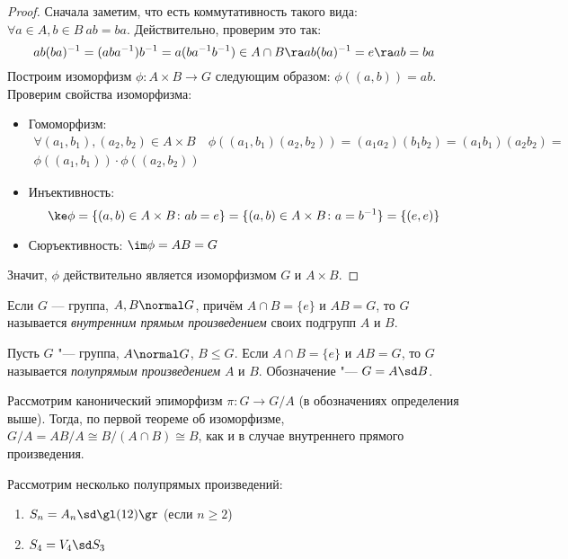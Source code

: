 \begin{proof}
	Сначала заметим, что есть коммутативность такого вида: $\forall a \in A, b \in B\ ab = ba$. Действительно, проверим это так:
	\[
		ab(ba)^{-1} = (aba^{-1})b^{-1} = a(ba^{-1}b^{-1}) \in A \cap B \ra ab(ba)^{-1} = e \ra ab = ba
	\]
	Построим изоморфизм $\phi \colon A \times B \to G$ следующим образом: $\phi((a, b)) = ab$. Проверим свойства изоморфизма:
	\begin{itemize}
		\item Гомоморфизм:
		\begin{multline*}
			\forall (a_1, b_1), (a_2, b_2) \in A \times B \quad \phi((a_1, b_1)(a_2, b_2)) = (a_1a_2)(b_1b_2) = (a_1b_1)(a_2b_2) =
			\\
			\phi((a_1, b_1)) \cdot \phi((a_2, b_2))
		\end{multline*}
		
		\item Инъективность:
		\[
			\ke\phi = \{(a, b) \in A \times B \colon ab = e\} = \{(a, b) \in A \times B \colon a = b^{-1}\} = \{(e, e)\}
		\]
		
		\item Сюръективность: $\im\phi = AB = G$
	\end{itemize}
	
	Значит, $\phi$ действительно является изоморфизмом $G$ и $A \times B$.
\end{proof}

\begin{definition}
	Если $G$ --- группа, $A, B \normal G$, причём $A \cap B = \{e\}$ и $AB = G$, то $G$ называется \textit{внутренним прямым произведением} своих подгрупп $A$ и $B$.
\end{definition}

\begin{definition}
	Пусть $G$ "--- группа, $A \normal G$, $B \le G$. Если $A \cap B = \{e\}$ и $AB = G$, то $G$ называется \textit{полупрямым произведением} $A$ и $B$. Обозначение "--- $G = A \sd B$.
\end{definition}

\begin{note}
	Рассмотрим канонический эпиморфизм $\pi \colon G \to G/A$ (в обозначениях определения выше). Тогда, по первой теореме об изоморфизме, $G / A = AB/A \cong B / (A \cap B) \cong B$, как и в случае внутреннего прямого произведения.
\end{note}

\begin{example} Рассмотрим несколько полупрямых произведений:
	\begin{enumerate}
		\item $S_n = A_n \sd \gl(12)\gr$ (если $n \ge 2$)
		\item $S_4 = V_4 \sd S_3$
	\end{enumerate}
\end{example}

